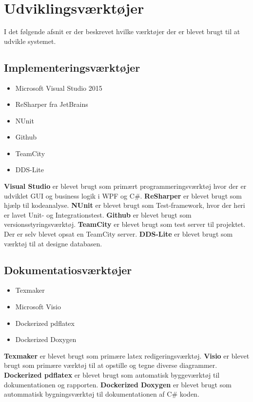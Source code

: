\section{Udviklingsværktøjer}
I det følgende afsnit er der beskrevet hvilke værktøjer der er blevet brugt til at udvikle systemet. 

\subsection*{Implementeringsværktøjer}
\begin{itemize}
	\item Microsoft Visual Studio 2015
	\item ReSharper fra JetBrains
	\item NUnit 
	\item Github
	\item TeamCity
	\item DDS-Lite	
\end{itemize}
\textbf{Visual Studio} er blevet brugt som primært programmeringsværktøj hvor der er udviklet GUI og business logik i WPF og C\#. \textbf{ReSharper} er blevet brugt som hjælp til kodeanalyse. \textbf{NUnit} er blevet brugt som Test-framework, hvor der heri er lavet Unit- og Integrationstest. \textbf{Github} er blevet brugt som  versionsstyringsværktøj. \textbf{TeamCity} er blevet brugt som test server til projektet. Der er selv blevet opsat en TeamCity server. \textbf{DDS-Lite} er blevet brugt som værktøj til at designe databasen. 

\subsection*{Dokumentatiosværktøjer}
\begin{itemize}
	\item Texmaker
	\item Microsoft Visio
	\item Dockerized pdflatex
	\item Dockerized Doxygen
\end{itemize}
\textbf{Texmaker} er blevet brugt som primære latex redigeringsværktøj. \textbf{Visio} er blevet brugt som primære værktøj til at opstille og tegne diverse diagrammer. \textbf{Dockerized pdflatex} er blevet brugt som automatisk byggeværktøj til dokumentationen og rapporten. \textbf{Dockerized Doxygen} er blevet brugt som autommatisk bygningsværktøj til dokumentationen af C\# koden. 